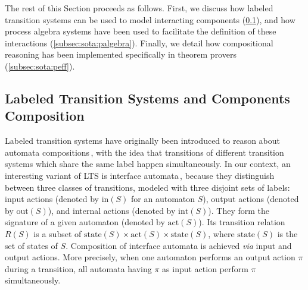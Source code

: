 The rest of this Section proceeds as follows.
%
First, we discuss how labeled transition systems can be used to model
interacting components (\ref{subsec:sota:ioauto}), and how process algebra
systems have been used to facilitate the definition of these interactions
(\ref{subsec:sota:palgebra}).
%
Finally, we detail how compositional reasoning has been implemented specifically
in theorem provers (\ref{subsec:sota:peff}).

\subsection{Labeled Transition Systems and Components Composition}
\label{subsec:sota:ioauto}

Labeled transition systems have originally been introduced to reason about
automata compositions\,\cite{loiseaux1995lts}, with the idea that transitions of
different transition systems which share the same label happen simultaneously.
%
In our context, an interesting variant of LTS is interface
automata\,\cite{de2001interfaceautomata}, because they distinguish between three
classes of transitions, modeled with three disjoint sets of labels: input
actions (denoted by \( \mathrm{in}(S) \) for an automaton \( S \)), output
actions (denoted by \( \mathrm{out}(S) \)), and internal actions (denoted by
\( \mathrm{int}(S) \)).
%
They form the signature of a given automaton (denoted by \( \mathrm{act}(S) \)).
%
Its transition relation \( R(S) \) is a subset of
\( \mathrm{state}(S) \times \mathrm{act}(S) \times \mathrm{state}(S) \), where
\( \mathrm{state}(S) \) is the set of states of \( S \).
%
Composition of interface automata is achieved \emph{via} input and output
actions.
%
More precisely, when one automaton performs an output action \( \pi \) during a
transition, all automata having \( \pi \) as input action perform \( \pi \)
simultaneously.


